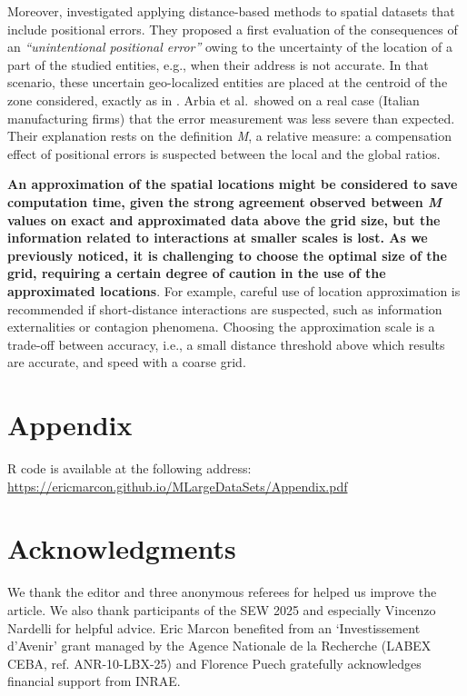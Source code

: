 \documentclass[fleqn,10pt]{latex/stylish_article} %
\begin{document}
Moreover, \citet{Arbia2017} investigated applying distance-based methods to spatial datasets that include positional errors.
They proposed a first evaluation of the consequences of an \emph{\enquote{unintentional positional error}} owing to the uncertainty of the location of a part of the studied entities, e.g., when their address is not accurate.
In that scenario, these uncertain geo-localized entities are placed at the centroid of the zone considered, exactly as in \citet{Tidu2023}.
Arbia et al.~showed on a real case (Italian manufacturing firms) that the error measurement was less severe than expected.
Their explanation rests on the definition \emph{M}, a relative measure: a compensation effect of positional errors is suspected between the local and the global ratios.

\textbf{An approximation of the spatial locations might be considered to save computation time, given the strong agreement observed between \emph{M} values on exact and approximated data above the grid size, but the information related to interactions at smaller scales is lost. As we previously noticed, it is challenging to choose the optimal size of the grid, requiring a certain degree of caution in the use of the approximated locations}.
For example, careful use of location approximation is recommended if short-distance interactions are suspected, such as information externalities or contagion phenomena.
Choosing the approximation scale is a trade-off between accuracy, i.e., a small distance threshold above which results are accurate, and speed with a coarse grid.

\section*{Appendix}\label{appendix}

R code is available at the following address: \url{https://ericmarcon.github.io/MLargeDataSets/Appendix.pdf}

\section*{Acknowledgments}\label{acknowledgments}

We thank the editor and three anonymous referees for helped us improve the article.
We also thank participants of the SEW 2025 and especially Vincenzo Nardelli for helpful advice.
Eric Marcon benefited from an \enquote*{Investissement d'Avenir} grant managed by the Agence Nationale de la Recherche (LABEX CEBA, ref. ANR-10-LBX-25) and Florence Puech gratefully acknowledges financial support from INRAE.
\end{document}
